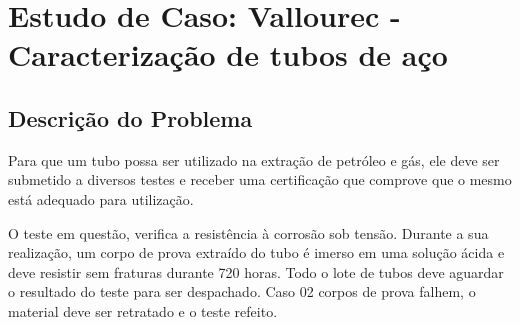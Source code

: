 



\section{Estudo de Caso: Vallourec - Caracterização de tubos de aço}

\subsection{Descrição do Problema}

Para que um tubo possa ser utilizado na extração de petróleo e gás, ele deve ser submetido a diversos testes e receber uma certificação que comprove que o mesmo está adequado para utilização.

O teste em questão, verifica a resistência à corrosão sob tensão. Durante a sua realização, um corpo de prova extraído do tubo é imerso em uma solução ácida e deve resistir sem fraturas durante 720 horas. Todo o lote de tubos deve aguardar o resultado do teste para ser despachado. Caso 02 corpos de prova falhem, o material deve ser retratado e o teste refeito. 

